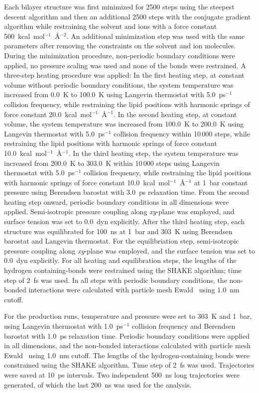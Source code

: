 \documentclass[journal=jpcbfk,manuscript=article]{achemso}
\begin{document}
Each bilayer structure was first minimized for 2500 steps using the steepest
descent algorithm and then an additional 2500 steps with the conjugate gradient
algorithm while restraining the solvent and ions with a force
constant 500~kcal~mol$^{-1}$~\AA{}$^{-2}$. An additional minimization
step was used with the same parameters after removing the constraints on
the solvent and ion molecules. During the minimization procedure,
non-periodic boundary conditions were applied, no pressure scaling was
used and none of the bonds were restrained. A three-step heating
procedure was applied: In the first heating step, at constant volume without periodic
boundary conditions, the system temperature
was increased from 0.0~K to 100.0~K using Langevin thermostat with
5.0~ps$^{-1}$ collision frequency, while restraining the lipid positions
with harmonic springs of force constant
20.0~kcal~mol$^{-1}$~\AA{}$^{-1}$. In the second heating step,  at constant volume, the system temperature
was increased from 100.0~K to 200.0~K using Langevin thermostat with
5.0~ps$^{-1}$ collision frequency within 10\,000 steps, while restraining
the lipid positions with harmonic springs of force constant
10.0~kcal~mol$^{-1}$~\AA{}$^{-1}$. In the third
heating step, the system temperature was increased from 200.0~K to
303.0~K within 10\,000 steps using Langevin thermostat with 5.0~ps$^{-1}$
collision frequency, while restraining the lipid positions with harmonic
springs of force constant 10.0~kcal~mol$^{-1}$~\AA{}$^{-1}$ at 1~bar
constant pressure using Berendsen barostat with 3.0~ps relaxation time.
From the second heating step onward, periodic boundary conditions in all
dimensions were applied. Semi-isotropic pressure coupling along
\textit{xy}-plane was employed, and surface tension was set to
0.0~dyn explicitly. After the third heating step, each structure was
equilibrated for 100~ns at 1~bar and 303~K using
Berendsen barostat and Langevin thermostat. For the equilibriation step, semi-isotropic pressure
coupling along \textit{xy}-plane was employed, and the surface tension
was set to 0.0~dyn explicitly. For all heating and equilibration steps,
the lengths of the hydrogen containing-bonds were restrained using the SHAKE
algorithm; time step of 2~fs was used. In all steps with periodic
boundary conditions, the non-bonded interactions were calculated with
particle mesh Ewald~\cite{essman95} using 1.0~nm cutoff.

For the production runs, temperature and pressure were set to 303~K
and 1~bar, using Langevin thermostat with 1.0~ps$^{-1}$ collision
frequency and Berendsen barostat with 1.0~ps relaxation time. Periodic boundary conditions were applied in all
dimensions, and the non-bonded interactions calculated with particle
mesh Ewald~\cite{essman95} using 1.0~nm cutoff. The lengths of the
hydrogen-containing bonds were constrained using the SHAKE algorithm.
Time step of 2~fs was used. Trajectories were saved at 10~ps
intervals. Two independent 500~ns long trajectories were generated, of which
the last 200~ns was used for the analysis.
\end{document}
